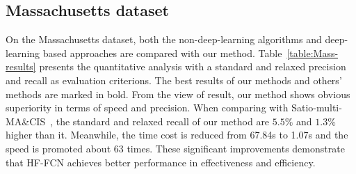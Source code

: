 \subsection{Massachusetts dataset}
On the Massachusetts dataset, both the non-deep-learning algorithms and deep-learning based approaches are compared with our method. 
Table~\ref{table:Mass-results} presents the quantitative analysis with a standard and relaxed precision and recall as evaluation criterions.
The best results of our methods and others' methods are marked in bold. 
From the view of result, our method shows obvious superiority in terms of speed and precision. When comparing with Satio-multi-MA\&CIS~\cite{IEEEexample:saito2016multiple}, the standard and relaxed recall of our method are $5.5\%$ and $1.3\%$ higher than it. Meanwhile, the time cost is reduced from 67.84s to 1.07s and the speed is promoted about 63 times.
These significant improvements demonstrate that HF-FCN achieves better performance in effectiveness and efficiency.

